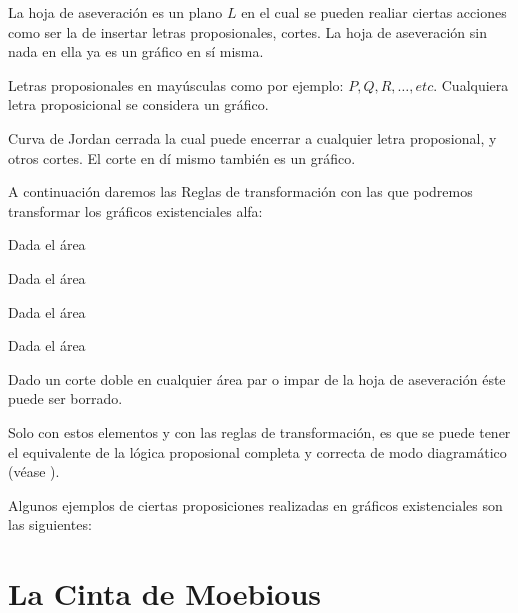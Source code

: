 \documentclass[
	fontsize=10pt, %
	twoside=true, %
	secnumdepth=1, %
	abstract=true, %
]{kaohandt}
\begin{document}
\begin{definition}
	La hoja de aseveración es un plano $ L $ en el cual se pueden realiar ciertas acciones como ser la de insertar letras proposionales, cortes. La hoja de aseveración sin nada en ella ya es un gráfico en sí misma.
\end{definition}

\begin{definition}
	Letras proposionales en mayúsculas como por ejemplo: $ P, Q, R, \dots, etc $. Cualquiera letra proposicional se considera un gráfico.
\end{definition}

\begin{definition}[Corte]
	Curva de Jordan cerrada la cual puede encerrar a cualquier letra proposional, y otros cortes. El corte en dí mismo también es un gráfico.
\end{definition}

A continuación daremos las Reglas de transformación con las que podremos transformar los gráficos existenciales alfa:

\begin{definition}
	Dada el área
\end{definition}

\begin{definition}
	Dada el área
\end{definition}

\begin{definition}
	Dada el área
\end{definition}

\begin{definition}
	Dada el área
\end{definition}

\begin{definition}
	Dado un corte doble en cualquier área par o impar de la hoja de aseveración éste puede ser borrado.
\end{definition}

Solo con estos elementos y con las reglas de transformación, es que se puede tener el equivalente de la lógica proposional completa y correcta de modo diagramático (véase \cite{roberts1973}).

Algunos ejemplos de ciertas proposiciones realizadas en gráficos existenciales son las siguientes:

\section{La Cinta de Moebious} %
\label{sec:La Cinta de Moebious}
\end{document}
